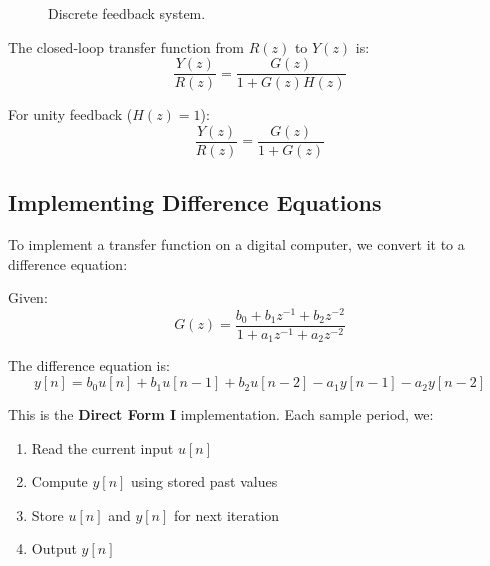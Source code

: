 \begin{figure}[htbp]
\centering
{}
\caption{Discrete feedback system.}
\label{fig:discrete_feedback}
\end{figure}

The closed-loop transfer function from $R(z)$ to $Y(z)$ is:
\begin{equation}
\frac{Y(z)}{R(z)} = \frac{G(z)}{1 + G(z)H(z)}
\end{equation}

For unity feedback ($H(z) = 1$):
\begin{equation}
\frac{Y(z)}{R(z)} = \frac{G(z)}{1 + G(z)}
\end{equation}

\subsection{Implementing Difference Equations}

To implement a transfer function on a digital computer, we convert it to a difference equation:

Given:
\begin{equation}
G(z) = \frac{b_0 + b_1 z^{-1} + b_2 z^{-2}}{1 + a_1 z^{-1} + a_2 z^{-2}}
\end{equation}

The difference equation is:
\begin{equation}
y[n] = b_0 u[n] + b_1 u[n-1] + b_2 u[n-2] - a_1 y[n-1] - a_2 y[n-2]
\end{equation}

This is the \textbf{Direct Form I} implementation. Each sample period, we:
\begin{enumerate}
    \item Read the current input $u[n]$
    \item Compute $y[n]$ using stored past values
    \item Store $u[n]$ and $y[n]$ for next iteration
    \item Output $y[n]$
\end{enumerate}

